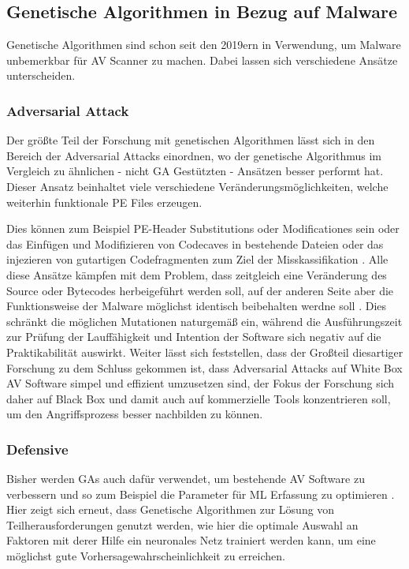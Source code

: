\subsection{Genetische Algorithmen in Bezug auf Malware}
Genetische Algorithmen sind schon seit den 2019ern \cite{castro_2019_aimed} in Verwendung, um Malware unbemerkbar für AV Scanner zu machen. Dabei lassen sich verschiedene Ansätze unterscheiden.
\subsubsection{Adversarial Attack}
\label{Adversarial_Genetic_Algos}
Der größte Teil der Forschung mit genetischen Algorithmen lässt sich in den Bereich der Adversarial Attacks einordnen, wo der genetische Algorithmus im Vergleich zu ähnlichen - nicht GA Gestützten - Ansätzen besser performt hat\cite{castro_2019_armed}. Dieser Ansatz beinhaltet viele verschiedene Veränderungsmöglichkeiten, welche weiterhin funktionale PE Files erzeugen.

Dies können zum Beispiel PE-Header Substitutions oder Modificationes sein \cite{demetrio_2021_adversarial} oder das Einfügen und Modifizieren von Codecaves in bestehende Dateien \cite{yuste_2022_optimization} oder das injezieren von gutartigen Codefragmenten zum Ziel der Misskassifikation \cite{demetrio_2024_formalizing}. Alle diese Ansätze kämpfen mit dem Problem, dass zeitgleich eine Veränderung des Source oder Bytecodes herbeigeführt werden soll, auf der anderen Seite aber die Funktionsweise der Malware möglichst identisch beibehalten werdne soll \cite{demetrio_2021_functionalitypreserving}. Dies schränkt die möglichen Mutationen naturgemäß ein, während die Ausführungszeit zur Prüfung der Lauffähigkeit und Intention der Software sich negativ auf die Praktikabilität auswirkt. 
Weiter lässt sich feststellen, dass der Großteil diesartiger Forschung zu dem Schluss gekommen ist, dass Adversarial Attacks auf White Box AV Software simpel und effizient umzusetzen sind, der Fokus der Forschung sich daher auf Black Box und damit auch auf kommerzielle Tools konzentrieren soll, um den Angriffsprozess besser nachbilden zu können.
\subsubsection{Defensive}
Bisher werden GAs auch dafür verwendet, um bestehende AV Software zu verbessern und so zum Beispiel die Parameter für ML Erfassung zu optimieren \cite{xie_2023_gastackingmd}. Hier zeigt sich erneut, dass Genetische Algorithmen zur Lösung von Teilherausforderungen genutzt werden, wie hier die optimale Auswahl an Faktoren mit derer Hilfe ein neuronales Netz trainiert werden kann, um eine möglichst gute Vorhersagewahrscheinlichkeit zu erreichen.
